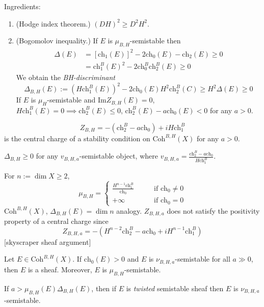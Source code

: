 Ingredients:
\begin{enumerate}
\item (Hodge index theorem.) $(DH)^2 \geq D^2
H^2$.
\item (Bogomolov inequality.) If $E$ is
$\mu_{B,H}$-semistable then
$$
\begin{aligned}
\Delta(E)&=[\text{ch}_1(E)]^2-2\text{ch}_0(E)
-\text{ch}_2(E)\geq
0\\
&=\text{ch}_1^B(E)^2-2\text{ch}_0^B\text{ch}
_2^B(E)\geq
0
\end{aligned}
$$
We obtain the {\it BH-discriminant}
$$
\Delta_{B,H}(E):=(H\text{ch}_1^B(E))
^2-2\text{ch}_0(E)H^2\text{ch}_2^B(C)
\geq H^2\Delta(E)\geq 0
$$
If $E$ is $\mu_H$-semistable and
$\text{Im}Z_{B,H}(E)=0$, $H\text{ch}_1^B(E)=0
\implies \text{ch}_2^B(E)\leq 0$,
$\text{ch}_2^B(E)-a\text{ch}_0(E)<0$
for any $a>0$.
\end{enumerate}

\begin{theorem}
\label{theorem-Bridgeland-Areni-Bersum}
$$
Z_{B,H}=-(\text{ch}_2^B-a\text{ch}_0)+
iH\text{ch}_1^B
$$
is the central charge of a stability
condition on $\text{Coh}^{B,H}(X)$ for any
$a>0$.
\end{theorem}

\begin{theorem}
\label{theorem-BH-discriminant}
$\Delta_{B,H}\geq 0$ for any
$v_{B,H,a}$-semistable object, where
$v_{B,H,a}=\frac{\text{ch}_2^B-a\text{ch}_0}
{H\text{ch}_1^B}$.
\end{theorem}

\medskip\noindent
For $n:=\dim X\geq 2$,
$$
\mu_{B,H}=
\begin{cases}
\frac{H^{n-1}\text{ch}_1^B}{\text{ch}_0}
\qquad
&\text{if }\text{ch}_0 \neq 0 \\
+\infty\qquad &\text{if }\text{ch}_0=0
\end{cases}
$$
$\text{Coh}^{B,H}(X)$, $\Delta_{B,H}(E)=\dim
n$ analogy. $Z_{B,H,a}$ does not satisfy the
positivity property of a central charge since
$$
Z_{B,H,a}=-(H^{n-2}\text{ch}_2^B-a\text{ch}
_0+
iH^{n-1}\text{ch}_1^B)
$$
[skyscraper sheaf argument]

\begin{exercise}
\label{exercise-E-is-a-sheaf}
Let $E \in \text{Coh}^{B,H}(X)$. If
$\text{ch}_0(E)>0$ and $E$ is
$\nu_{B,H,a}$-semistable for all $a\gg 0$,
then $E$ is a sheaf. Moreover, $E$ is
$\mu_{B,H}$-semistable.
\end{exercise}

\begin{proposition}[Lo,---]
\label{proposition-duplicate-2}
If $a>\mu_{B,H}(E)\Delta_{B,H}(E)$, then if
$E$ is {\it twisted} semistable sheaf then
$E$ is $\nu_{B,H,a}$-semistable.
\end{proposition}

